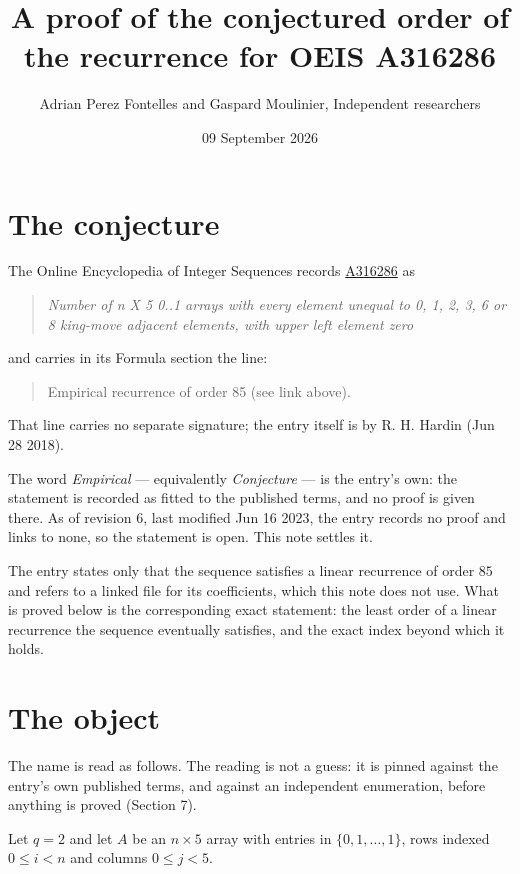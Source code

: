 \documentclass[11pt]{article}
\title{A proof of the conjectured order of the recurrence for OEIS A316286}
\author{Adrian Perez Fontelles and Gaspard Moulinier, Independent researchers}
\date{09 September 2026}
\theoremstyle{definition}
\begin{document}
\maketitle
\section{The conjecture}

The Online Encyclopedia of Integer Sequences records \href{https://oeis.org/A316286}{A316286} as

\begin{quote}\itshape Number of n X 5 0..1 arrays with every element unequal to 0, 1, 2, 3, 6 or 8 king-move adjacent elements, with upper left element zero\end{quote}

and carries in its Formula section the line:

\begin{quote}\ttfamily Empirical recurrence of order 85 (see link above).\end{quote}

That line carries no separate signature; the entry itself is by R. H. Hardin (Jun 28 2018).

The word {\itshape Empirical} --- equivalently {\itshape Conjecture} --- is the entry's own: the statement is recorded as fitted to the published terms, and no proof is given there. As of revision 6, last modified Jun 16 2023, the entry records no proof and links to none, so the statement is open. This note settles it.

The entry states only that the sequence satisfies a linear recurrence of order $85$ and refers to a linked file for its coefficients, which this note does not use. What is proved below is the corresponding exact statement: the least order of a linear recurrence the sequence eventually satisfies, and the exact index beyond which it holds.

\section{The object}

The name is read as follows. The reading is not a guess: it is pinned against the entry's own published terms, and against an independent enumeration, before anything is proved (Section 7).

Let $q = 2$ and let $A$ be an $n \times 5$ array with entries in $\{0,1,\dots,1\}$, rows indexed $0 \le i < n$ and columns $0 \le j < 5$.
\end{document}
